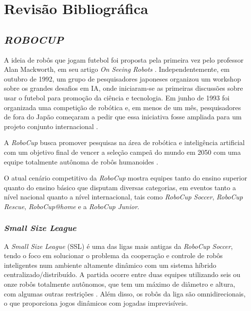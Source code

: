 \documentclass[acronym, symbols, table]{fei}
\begin{document}
		
\chapter{Revisão Bibliográfica}\label{sec:revisao_bibliografica}

	\section{\textit{ROBOCUP}}
	
		A ideia de robôs que jogam futebol foi proposta pela primeira vez pelo professor Alan Mackworth, em seu artigo \textit{On Seeing Robots} \cite{OnSeeingRobots}. Independentemente, em outubro de 1992, um grupo de pesquisadores japoneses organizou um workshop sobre os grandes desafios em IA, onde iniciaram-se as primeiras discussões sobre usar o futebol para promoção da ciência e tecnologia. Em junho de 1993 foi organizada uma competição de robótica e, em menos de um mês, pesquisadores de fora do Japão começaram a pedir que essa iniciativa fosse ampliada para um projeto conjunto internacional \cite{RoboCup}.
		
		A \textit{RoboCup} busca promover pesquisas na área de robótica e inteligência artificial com um objetivo final de vencer a seleção campeã do mundo em 2050 com uma equipe totalmente autônoma de robôs humanoides \cite{RoboCup}.
		
		O atual cenário competitivo da \textit{RoboCup} mostra equipes tanto do ensino superior quanto do ensino básico que disputam diversas categorias, em eventos tanto a nível nacional quanto a nível internacional, tais como \textit{RoboCup Soccer}, \textit{RoboCup Rescue}, \textit{RoboCup@home} e a \textit{RoboCup Junior}.
	
	\subsection{\textit{Small Size League}} \label{sec:small_size_league}
	
		A \textit{Small Size League} (SSL) é uma das ligas mais antigas da \textit{RoboCup Soccer}, tendo o foco em solucionar o problema da cooperação e controle de robôs inteligentes num ambiente altamente dinâmico com um sistema híbrido centralizado/distribuído. A partida ocorre entre duas equipes utilizando seis ou onze robôs totalmente autônomos, que tem um máximo de diâmetro e altura, com algumas outras restrições \cite{RoboCup}. Além disso, os robôs da liga são omnidirecionais, o que proporciona jogos dinâmicos com jogadas imprevisíveis.
		
\end{document}
